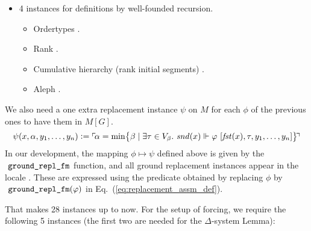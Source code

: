 \begin{itemize}
\begin{itemize}
  \item
    .
  \end{itemize}
\item
  4 instances for definitions by well-founded recursion.
  \begin{itemize}
  \item Ordertypes
    .
  \item Rank .
  \item Cumulative hierarchy (rank initial segments) .
  \item Aleph .
  \end{itemize}
\end{itemize}

We also need a one extra replacement instance $\psi$ on $M$ for each
$\phi$ of the
previous ones to have them in $M[G]$.
\[
  \psi(x,\alpha,y_1,\dots,y_n) \mathrel{\mathop:}= \ulcorner{\!\alpha = \min \bigl\{
    \beta \mid \exists\tau\in V_\beta.\  \mathit{snd}(x) \Vdash\varphi\ [\mathit{fst}(x),\tau,y_1,\dots,y_n]\bigr\}\!}\urcorner
\]
In our development, the mapping $\phi\mapsto\psi$ defined above is given by the
$\isatt{ground{\uscore}repl{\uscore}fm}$ function, and all ground replacement
instances appear in the locale . These are expressed using
the  predicate
obtained by replacing $\phi$ by
$\isatt{ground{\uscore}repl{\uscore}fm}(\phi)$ in Eq.~(\ref{eq:replacement_assm_def}).

That makes 28 instances up to now. For the setup of forcing, we
require the following 5 instances (the first two are  needed for the $\Delta$-system Lemma):

